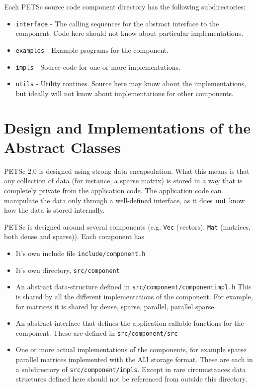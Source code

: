Each PETSc source code component directory has the following subdirectories:
\begin{itemize}
\item  {\tt interface} - The calling sequences for the abstract interface  
        to the component.
        Code here should not know about particular implementations.
\item  {\tt examples} - Example programs for the component.
\item  {\tt impls} - Source code for one or more implementations.
\item  {\tt utils} - Utility routines.  Source here may know about the 
          implementations, but ideally will not know about implementations
          for other components.
\end{itemize}


\chapter{Design and Implementations of the  Abstract Classes}
\label{chapter:design}

PETSc 2.0 is designed using strong data encapsulation. What this means is 
that any collection of data (for instance, a sparse matrix) is stored in 
a way that is completely private from the application code. The application 
code can manipulate the data only through a well-defined interface, as it 
does {\bf not} know how the data is stored internally. 

PETSc is designed around several components (e.g. {\tt Vec} (vectors),
{\tt Mat} (matrices, both dense and sparse)). Each component has
\begin{itemize}
\item It's own include file {\tt include/component.h} 
\item It's own directory, {\tt src/component}
\item An abstract data-structure defined in 
      {\tt src/component/componentimpl.h}
      This is shared by all the different implementations of the 
      component. For example, for matrices it is shared by dense,
      sparse, parallel, parallel sparse.
\item An abstract interface that defines the application callable 
      functions for the component. These are defined in 
      {\tt src/component/src}
\item One or more actual implementations of the components, for example
      sparse parallel matrices implemented with the AIJ storage format.
      These are each in a subdirectory of 
      {\tt src/component/impls}. Except in rare circumstances data 
      structures defined here should not be referenced from outside this 
      directory.
\end{itemize}

